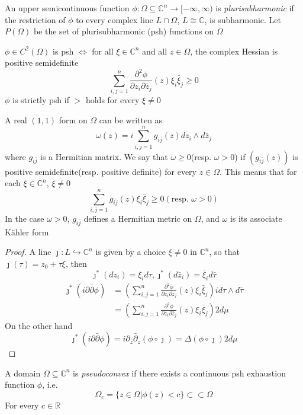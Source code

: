 \documentclass[../main.tex]{subfiles}
\begin{document}
\begin{definition}
An upper semicontinuous function $\phi:\Omega\subseteq \mathbb C^n\to[-\infty,\infty)$ is \textit{plurisubharmonic} if the restriction of $\phi$ to every complex line $L\cap\Omega$, $L\cong\mathbb C$, is subharmonic. Let $P(\Omega)$ be the set of plurisubharmonic (psh) functions on $\Omega$
\end{definition}

\begin{proposition}
$\phi\in C^2(\Omega)$ is psh $\iff$ for all $\xi\in\mathbb C^n$ and all $z\in\Omega$, the complex Hessian is positive semidefinite
\[\sum_{i,j=1}^n\frac{\partial^2\phi}{\partial z_i\partial\bar z_j}(z)\xi_i\bar\xi_j\geq0\]
$\phi$ is strictly psh if $>$ holds for every $\xi\neq0$
\end{proposition}

\begin{remark}
A real $(1,1)$ form on $\Omega$ can be written as
\[\omega(z)=i\sum_{i,j=1}^ng_{i\bar j}(z)dz_i\wedge d\bar z_j\]
where $g_{i\bar j}$ is a Hermitian matrix. We say that $\omega\geq0$(resp. $\omega>0$) if $(g_{i\bar j}(z))$ is positive semidefinite(resp. positive definite) for every $z\in\Omega$. This means that for each $\xi\in\mathbb C^n$, $\xi\neq0$
\[\sum_{i,j=1}^ng_{i\bar j}(z)\xi_i\bar\xi_j\geq0(\text{resp. }\omega>0)\]
In the case $\omega>0$, $g_{i\bar j}$ defines a Hermitian metric on $\Omega$, and $\omega$ is its associate K\"ahler form
\end{remark}

\begin{proof}
A line $\jmath:L\hookrightarrow\mathbb C^n$ is given by a choice $\xi\neq0$ in $\mathbb C^n$, so that $\jmath(\tau)=z_0+\tau\xi$, then
\[\jmath^*(dz_i)=\xi_id\tau,\jmath^*(d\bar z_i)=\bar\xi_id\bar\tau\]
\begin{align*}
\jmath^*(i\partial\bar\partial\phi)&=\left(\sum_{i,j=1}^n\frac{\partial^2\phi}{\partial z_i\partial\bar z_j}(z)\xi_i\bar\xi_j\right)id\tau\wedge d\bar\tau \\
&=\left(\sum_{i,j=1}^n\frac{\partial^2\phi}{\partial z_i\partial\bar z_j}(z)\xi_i\bar\xi_j\right)2d\mu
\end{align*}
On the other hand
\[\jmath^*(i\partial\bar\partial\phi)=i\partial_z\bar\partial_z(\phi\circ\jmath)=\Delta(\phi\circ\jmath)2d\mu\]
\end{proof}

\begin{definition}
A domain $\Omega\subseteq\mathbb C^n$ is \textit{pseudoconvex} if there exists a continuous psh exhaustion function $\phi$, i.e.
\[\Omega_c=\{z\in\Omega|\phi(z)<c\}\subset\subset\Omega\]
For every $c\in\mathbb R$
\end{definition}
\end{document}

